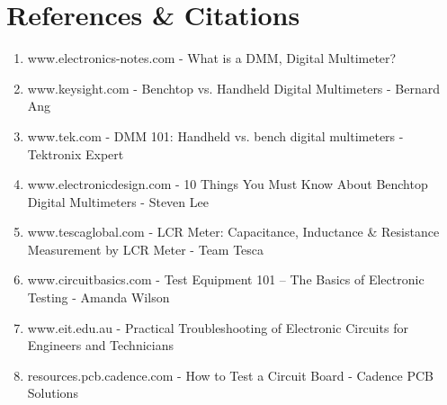 \documentclass[12pt]{article}
\begin{document}
	\section{References \& Citations}
	\begin{enumerate}
		\item www.electronics-notes.com - What is a DMM, Digital Multimeter?
		\item www.keysight.com - Benchtop vs. Handheld Digital Multimeters - Bernard Ang
		\item www.tek.com - DMM 101: Handheld vs. bench digital multimeters - Tektronix Expert
		\item www.electronicdesign.com - 10 Things You Must Know About Benchtop Digital Multimeters - Steven Lee
		\item www.tescaglobal.com - LCR Meter: Capacitance, Inductance \& Resistance Measurement by LCR Meter - Team Tesca
		\item www.circuitbasics.com - Test Equipment 101 – The Basics of Electronic Testing - Amanda Wilson
		\item www.eit.edu.au - Practical Troubleshooting of Electronic Circuits for Engineers and Technicians
		\item resources.pcb.cadence.com - How to Test a Circuit Board - Cadence PCB Solutions
	\end{enumerate}
	
	
\end{document}
